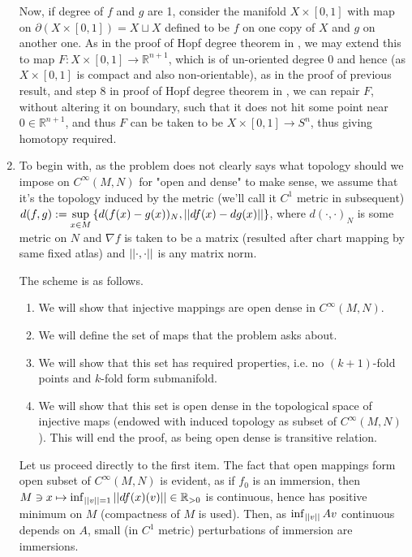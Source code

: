 \documentclass[8pt]{article} %
\begin{document}
\begin{enumerate}[label=\bfseries \arabic*.]
		Now, if degree of $f$ and $g$ are 1, consider the manifold $X\times[0,1]$ with map on $\partial(X\times[0,1])=X\sqcup X$
		defined to be $f$ on one copy of $X$ and $g$ on another one. As in the proof of Hopf degree theorem in \cite{gp}, we may extend
		this to map $F:X\times[0,1]\to\mathbb{R}^{n+1}$, which is of un-oriented degree $0$ and hence (as $X\times[0,1]$ is compact and
		also non-orientable), as in the proof of previous result, and step 8 in proof of Hopf degree theorem in \cite{gp}, we can
		repair $F$, without altering it on boundary, such that it does not hit some point near $0\in\mathbb{R}^{n+1}$, and
		thus $F$ can be taken to be $X\times[0,1]\to S^n$, thus giving homotopy required.
	\item To begin with, as the problem does not clearly says what topology should we impose on $C^{\infty}(M,N)$ for "open and dense" to make
		sense, we assume that it's the topology induced by the metric (we'll call it $C^1$ metric in subsequent)
		$d(f,g):=\sup_{x\in M}\mycbra{d(f(x)-g(x))_N,\mynorm{df(x)
		-dg(x)}}$, where $d(\cdot,\cdot)_N$ is some metric on $N$ and $\nabla f$ is taken to be a matrix (resulted after chart
		mapping by same fixed atlas) and $\left|\left|\cdot,\cdot\right|\right|$ is any matrix norm.

		The scheme is as follows.
		\begin{enumerate}[label=\arabic*.]
			\item We will show that injective mappings are open dense in $C^{\infty}(M,N)$.
			\item We will define the set of maps that the problem asks about.
			\item We will show that this set has required properties, i.e. no $(k+1)$-fold points and $k$-fold form submanifold.
			\item We will show that this set is open dense in the topological space of injective maps (endowed
				with induced topology as subset of $C^{\infty}(M,N)$). This will end the proof,
				as being open dense is transitive relation.
		\end{enumerate}
		Let us proceed directly to the first item. The fact that open mappings form open subset of $C^{\infty}(M,N)$ is evident,
		as if $f_0$ is an immersion, then $M\ni x\mapsto\inf_{\left|\left|v\right|\right|=1}\left|\left|df(x)(v)\right|\right|\in\mathbb{R}_{>0}$ is continuous, hence
		has positive minimum on $M$ (compactness of $M$ is used). Then, as $\inf_{\left|\left|v\right|\right|}{Av}$ continuous depends on $A$, small (in
		$C^1$ metric) perturbations of immersion are immersions.


\end{enumerate}
\end{document}

